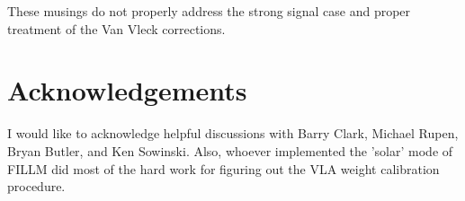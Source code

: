 These musings do not properly address the strong signal case
and proper treatment of the Van Vleck corrections.

\section{Acknowledgements}

I would like to acknowledge helpful discussions with Barry Clark,
Michael Rupen, Bryan Butler, and Ken Sowinski.  Also, whoever
implemented the 'solar' mode of FILLM did most of the hard work for
figuring out the VLA weight calibration procedure.


